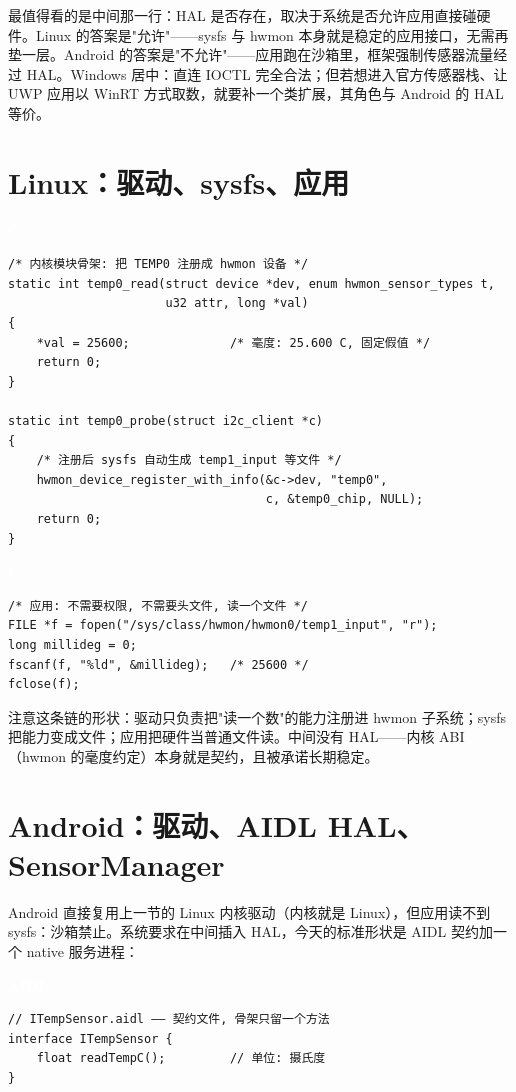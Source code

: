\documentclass[12pt,a4paper,fontset=fandol]{ctexbook}
\newcommand{\clabel}{%
  \begin{tcolorbox}[enhanced,colback=cheadbg,colframe=cheadbg,
    arc=1mm,boxrule=0mm,left=6pt,right=6pt,top=2pt,bottom=2pt,
    halign=left,oversize]
    \textcolor{white}{\small\bfseries C}
  \end{tcolorbox}\vspace{-4pt}}
\newcommand{\aidllabel}{%
  \begin{tcolorbox}[enhanced,colback=aidlheadbg,colframe=aidlheadbg,
    arc=1mm,boxrule=0mm,left=6pt,right=6pt,top=2pt,bottom=2pt,
    halign=left,oversize]
    \textcolor{white}{\small\bfseries AIDL}
  \end{tcolorbox}\vspace{-4pt}}
\begin{document}
最值得看的是中间那一行：HAL 是否存在，取决于系统是否允许应用直接碰硬件。Linux 的答案是"允许"——sysfs 与 hwmon 本身就是稳定的应用接口，无需再垫一层。Android 的答案是"不允许"——应用跑在沙箱里，框架强制传感器流量经过 HAL。Windows 居中：直连 IOCTL 完全合法；但若想进入官方传感器栈、让 UWP 应用以 WinRT 方式取数，就要补一个类扩展，其角色与 Android 的 HAL 等价。

\section{Linux：驱动、sysfs、应用}

\clabel
\begin{lstlisting}[style=cstyle]
/* 内核模块骨架: 把 TEMP0 注册成 hwmon 设备 */
static int temp0_read(struct device *dev, enum hwmon_sensor_types t,
                      u32 attr, long *val)
{
    *val = 25600;              /* 毫度: 25.600 C, 固定假值 */
    return 0;
}

static int temp0_probe(struct i2c_client *c)
{
    /* 注册后 sysfs 自动生成 temp1_input 等文件 */
    hwmon_device_register_with_info(&c->dev, "temp0",
                                    c, &temp0_chip, NULL);
    return 0;
}
\end{lstlisting}

\clabel
\begin{lstlisting}[style=cstyle]
/* 应用: 不需要权限, 不需要头文件, 读一个文件 */
FILE *f = fopen("/sys/class/hwmon/hwmon0/temp1_input", "r");
long millideg = 0;
fscanf(f, "%ld", &millideg);   /* 25600 */
fclose(f);
\end{lstlisting}

注意这条链的形状：驱动只负责把"读一个数"的能力注册进 hwmon 子系统；sysfs 把能力变成文件；应用把硬件当普通文件读。中间没有 HAL——内核 ABI（hwmon 的毫度约定）本身就是契约，且被承诺长期稳定。

\section{Android：驱动、AIDL HAL、SensorManager}

Android 直接复用上一节的 Linux 内核驱动（内核就是 Linux），但应用读不到 sysfs：沙箱禁止。系统要求在中间插入 HAL，今天的标准形状是 AIDL 契约加一个 native 服务进程：

\aidllabel
\begin{lstlisting}[style=javastyle]
// ITempSensor.aidl —— 契约文件, 骨架只留一个方法
interface ITempSensor {
    float readTempC();         // 单位: 摄氏度
}
\end{lstlisting}
\end{document}
